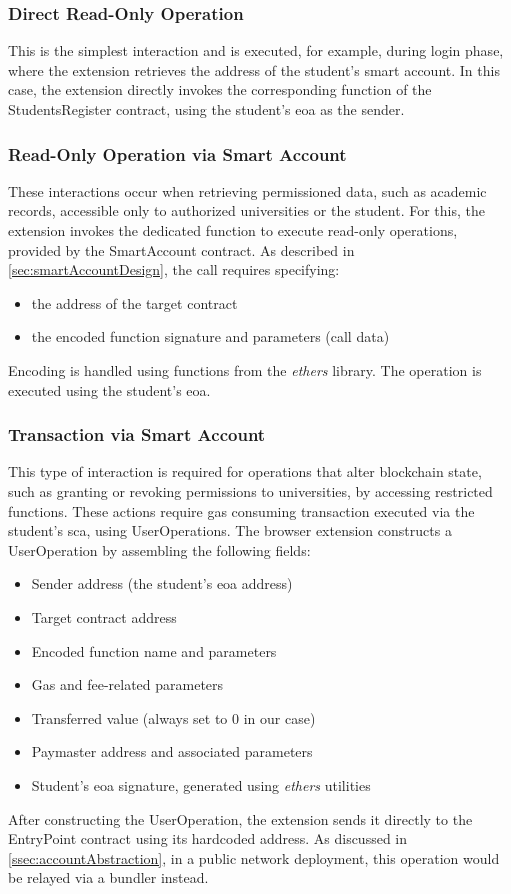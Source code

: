\subsubsection{Direct Read-Only Operation}
This is the simplest interaction and is executed, for example, during login phase, where the extension retrieves the address of the student's smart account. In this case, the extension directly invokes the corresponding function of the StudentsRegister contract, using the student's \acrshort{eoa} as the sender. 

\subsubsection{Read-Only Operation via Smart Account}
These interactions occur when retrieving permissioned data, such as academic records, accessible only to authorized universities or the student. For this, the extension invokes the dedicated function to execute read-only operations, provided by the SmartAccount contract. As described in \cref{sec:smartAccountDesign}, the call requires specifying:

\begin{itemize}
    \item the address of the target contract
    \item the encoded function signature and parameters (call data)
\end{itemize}
Encoding is handled using functions from the \textit{ethers} library. The operation is executed using the student's \acrshort{eoa}.

\subsubsection{Transaction via Smart Account}
This type of interaction is required for operations that alter blockchain state, such as granting or revoking permissions to universities, by accessing restricted functions. These actions require gas consuming transaction executed via the student's \acrlong{sca}, using UserOperations.
The browser extension constructs a UserOperation by assembling the following fields:
\begin{itemize}
    \item Sender address (the student's \acrshort{eoa} address)
    \item Target contract address
    \item Encoded function name and parameters
    \item Gas and fee-related parameters
    \item Transferred value (always set to 0 in our case)
    \item Paymaster address and associated parameters
    \item Student's \acrshort{eoa} signature, generated using \textit{ethers} utilities
\end{itemize}
After constructing the UserOperation, the extension sends it directly to the EntryPoint contract using its hardcoded address. As discussed in \cref{ssec:accountAbstraction}, in a public network deployment, this operation would be relayed via a bundler instead.

